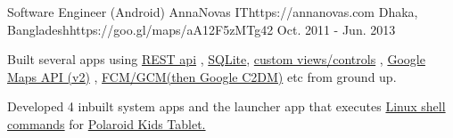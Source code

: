 \begin{workentries}
  \workentry
    {Software Engineer (Android)} %
    {AnnaNovas IT}{https://annanovas.com} %
    {Dhaka, Bangladesh}{https://goo.gl/maps/aA12F5zMTg42} %
    {Oct. 2011 - Jun. 2013} %
    {
      \begin{workitems} %
        \item {Built several apps using 
        {\href{https://en.wikipedia.org/wiki/Representational_state_transfer}{REST api}}
        , 
        {\href{https://www.sqlite.org/about.html}{SQLite}}, 
        {\href{https://developer.android.com/guide/topics/ui/custom-components}{custom views/controls}}
        , 
        {\href{https://developer.android.com/guide/topics/ui/custom-components}{Google Maps API (v2)}}
        , 
        {\href{https://firebase.google.com/docs/cloud-messaging/}{FCM/GCM(then Google C2DM)}} etc from ground up.}
        \item {Developed 4 inbuilt system apps and the launcher app that executes 
        {\href{https://forum.xda-developers.com/showthread.php?t=1694251}{Linux shell commands}} 
        for }
        {\href{https://www.polaroid.com/kids-tablet-2}{Polaroid Kids Tablet.}}
      \end{workitems}
    }

\end{workentries}
